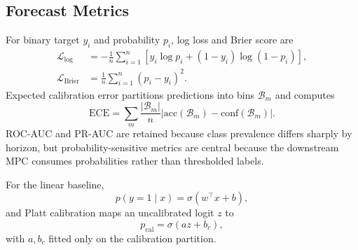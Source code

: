 \documentclass[journal,10pt]{IEEEtran}
\newcommand{\1}{\mathbf{1}}
\begin{document}
\begin{table}[t]
\centering
\caption{Primary Experimental Populations}
\label{tab:populations}
\scriptsize
\setlength{\tabcolsep}{2.8pt}
\end{table}

\subsection{Forecast Metrics}
For binary target $y_i$ and probability $p_i$, log loss and Brier score are
\begin{align}
\mathcal{L}_{\log} &=-\frac{1}{n}\sum_{i=1}^{n}\left[y_i\log p_i+(1-y_i)\log(1-p_i)\right],\\
\mathcal{L}_{\mathrm{Brier}} &=\frac{1}{n}\sum_{i=1}^{n}(p_i-y_i)^2.
\end{align}
Expected calibration error partitions predictions into bins $\mathcal{B}_m$ and computes
\begin{equation}
\mathrm{ECE}=\sum_m \frac{|\mathcal{B}_m|}{n}\left|\mathrm{acc}(\mathcal{B}_m)-\mathrm{conf}(\mathcal{B}_m)\right|.
\end{equation}
ROC-AUC and PR-AUC are retained because class prevalence differs sharply by horizon, but probability-sensitive metrics are central because the downstream MPC consumes probabilities rather than thresholded labels.

For the linear baseline,
\begin{equation}
p(y=1\mid x)=\sigma(w^\top x+b),
\end{equation}
and Platt calibration maps an uncalibrated logit $z$ to
\begin{equation}
p_{\mathrm{cal}}=\sigma(az+b_c),
\label{eq:platt}
\end{equation}
with $a,b_c$ fitted only on the calibration partition.
\end{document}

